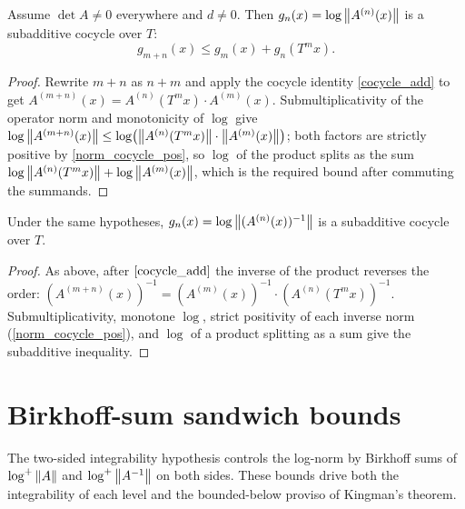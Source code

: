 \begin{theorem}\label{isSubadditiveCocycle_logNorm}
  \leanok
  Assume \(\det A \neq 0\) everywhere and \(d \neq 0\). Then
  \(g_n(x) = \log\left\lVert A^{(n)}(x) \right\rVert\) is a subadditive cocycle over \(T\):
  \[
    g_{m+n}(x) \le g_m(x) + g_n(T^{m}x).
  \]
\end{theorem}
\begin{proof}\leanok
  Rewrite \(m+n\) as \(n+m\) and apply the cocycle identity \ref{cocycle_add} to get
  \(A^{(m+n)}(x) = A^{(n)}(T^{m}x)\cdot A^{(m)}(x)\). Submultiplicativity of the operator
  norm and monotonicity of \(\log\) give
  \(\log\left\lVert A^{(m+n)}(x) \right\rVert \le \log\bigl(\left\lVert A^{(n)}(T^{m}x) \right\rVert\cdot\left\lVert A^{(m)}(x) \right\rVert\bigr)\);
  both factors are strictly positive by \ref{norm_cocycle_pos}, so \(\log\) of the product
  splits as the sum \(\log\left\lVert A^{(n)}(T^{m}x) \right\rVert + \log\left\lVert A^{(m)}(x) \right\rVert\), which is the
  required bound after commuting the summands.
\end{proof}

\begin{theorem}\label{isSubadditiveCocycle_logNorm_inv}
  \leanok
  Under the same hypotheses, \(g_n(x) = \log\left\lVert (A^{(n)}(x))^{-1} \right\rVert\) is a subadditive
  cocycle over \(T\).
\end{theorem}
\begin{proof}\leanok
  As above, after \(\ref{cocycle_add}\) the inverse of the product reverses the order:
  \((A^{(m+n)}(x))^{-1} = (A^{(m)}(x))^{-1}\cdot (A^{(n)}(T^{m}x))^{-1}\). Submultiplicativity,
  monotone \(\log\), strict positivity of each inverse norm (\ref{norm_cocycle_pos}), and
  \(\log\) of a product splitting as a sum give the subadditive inequality.
\end{proof}

\section{Birkhoff-sum sandwich bounds}

The two-sided integrability hypothesis controls the log-norm by Birkhoff sums of
\(\log^{+}\left\lVert A \right\rVert\) and \(\log^{+}\left\lVert A^{-1} \right\rVert\) on both sides. These bounds drive both
the integrability of each level and the bounded-below proviso of Kingman's theorem.

